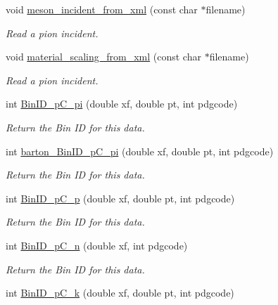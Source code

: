 \begin{DoxyCompactItemize}
void \hyperlink{class_neutrino_flux_reweight_1_1_thin_target_bins_ac23a1ef25307b5f415d53d24ee022266}{meson\-\_\-incident\-\_\-from\-\_\-xml} (const char $\ast$filename)
\begin{DoxyCompactList}\small\item\em Read a pion incident. \end{DoxyCompactList}\item 
void \hyperlink{class_neutrino_flux_reweight_1_1_thin_target_bins_a67969c63f34b68201311a008632c302d}{material\-\_\-scaling\-\_\-from\-\_\-xml} (const char $\ast$filename)
\begin{DoxyCompactList}\small\item\em Read a pion incident. \end{DoxyCompactList}\item 
int \hyperlink{class_neutrino_flux_reweight_1_1_thin_target_bins_ab14a12ba387fab46b80499e298247ddb}{Bin\-I\-D\-\_\-p\-C\-\_\-pi} (double xf, double pt, int pdgcode)
\begin{DoxyCompactList}\small\item\em Return the Bin I\-D for this data. \end{DoxyCompactList}\item 
int \hyperlink{class_neutrino_flux_reweight_1_1_thin_target_bins_abeffe5ee913d05777ba57d0f42a436e5}{barton\-\_\-\-Bin\-I\-D\-\_\-p\-C\-\_\-pi} (double xf, double pt, int pdgcode)
\begin{DoxyCompactList}\small\item\em Return the Bin I\-D for this data. \end{DoxyCompactList}\item 
int \hyperlink{class_neutrino_flux_reweight_1_1_thin_target_bins_a6ec6b61ca9b75f5406ab99fa03ecc3a4}{Bin\-I\-D\-\_\-p\-C\-\_\-p} (double xf, double pt, int pdgcode)
\begin{DoxyCompactList}\small\item\em Return the Bin I\-D for this data. \end{DoxyCompactList}\item 
int \hyperlink{class_neutrino_flux_reweight_1_1_thin_target_bins_ab687ad7f435705ea7ab8631966efe872}{Bin\-I\-D\-\_\-p\-C\-\_\-n} (double xf, int pdgcode)
\begin{DoxyCompactList}\small\item\em Return the Bin I\-D for this data. \end{DoxyCompactList}\item 
int \hyperlink{class_neutrino_flux_reweight_1_1_thin_target_bins_af67c16b492be6f09eb415b839459b4f9}{Bin\-I\-D\-\_\-p\-C\-\_\-k} (double xf, double pt, int pdgcode)

\end{DoxyCompactItemize}
